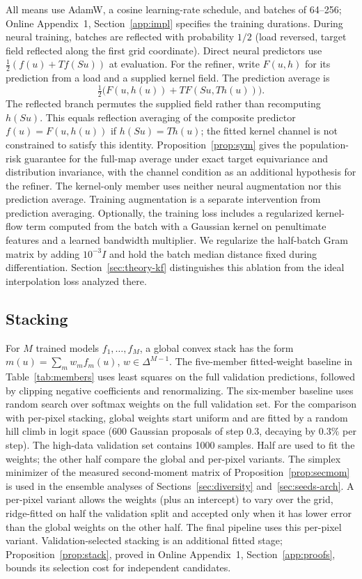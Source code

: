 \documentclass[twoside,11pt]{article}
\begin{document}
All means use AdamW, a cosine learning-rate schedule, and batches of 64--256;
Online Appendix~1, Section~\ref{app:impl} specifies the training durations.
During neural training, batches are reflected with probability $1/2$ (load reversed,
target field reflected along the first grid coordinate). Direct neural
predictors use $\frac12(f(u)+T f(Su))$ at evaluation. For the refiner, write
$F(u,h)$ for its prediction from a load and a supplied kernel field. The prediction average is
\[
\tfrac12\big(F(u,h(u))+T F(Su,T h(u))\big).
\]
The reflected branch permutes the supplied field rather than recomputing
$h(Su)$. This equals reflection averaging of the composite predictor
$f(u)=F(u,h(u))$ if $h(Su)=T h(u)$; the fitted kernel channel is not
constrained to satisfy this identity. Proposition~\ref{prop:sym} gives the population-risk
guarantee for the full-map average under exact target equivariance and
distribution invariance, with the channel condition as an additional
hypothesis for the refiner. The kernel-only member
uses neither neural augmentation nor this prediction average. Training
augmentation is a separate intervention from prediction averaging.
Optionally, the training
loss includes a regularized kernel-flow term computed from the batch
with a Gaussian kernel on penultimate features and a learned bandwidth
multiplier. We regularize the half-batch Gram matrix by adding $10^{-3}I$
and hold the batch median distance fixed during differentiation.
Section~\ref{sec:theory-kf} distinguishes this ablation from the ideal
interpolation loss analyzed there.

\subsection{Stacking}
For $M$ trained models $f_1,\dots,f_M$, a global convex stack has the form
$m(u)=\sum_m w_m f_m(u)$, $w\in\Delta^{M-1}$. The five-member fitted-weight baseline in
Table~\ref{tab:members} uses least squares on the full validation
predictions, followed by clipping negative coefficients and renormalizing.
The six-member baseline uses random search over softmax weights on the
full validation set. For the comparison with per-pixel stacking, global
weights start uniform and are fitted by a random hill climb in logit space ($600$ Gaussian proposals of step $0.3$,
decaying by $0.3\%$ per step). The high-data validation set contains 1000 samples. Half are used to
fit the weights; the other half compare the global and per-pixel variants. The simplex minimizer of the measured second-moment matrix of
Proposition~\ref{prop:secmom} is used in the ensemble analyses of Sections~\ref{sec:diversity} and~\ref{sec:seeds-arch}. A per-pixel variant allows the weights (plus an intercept) to
vary over the grid, ridge-fitted on half the validation split and accepted
only when it has lower error than the global weights on the other half.
The final pipeline uses this per-pixel variant. Validation-selected stacking \citep{wolpert1992stacked} is an additional fitted stage; Proposition~\ref{prop:stack}, proved in Online Appendix~1, Section~\ref{app:proofs}, bounds its selection cost for independent candidates.
\end{document}

